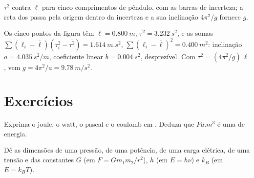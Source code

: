 \begin{omfigure}

{\small $\tau^2$ contra $\ell$ para cinco comprimentos de pêndulo, com as
barras de incerteza; a reta dos  passa pela origem
dentro da incerteza e a sua inclinação $4\pi^2/g$ fornece $g$.}
\end{omfigure}

\begin{example}\label{ex:b1:units-dimensions:slope}
Os cinco pontos da figura têm $\bar\ell = \qty{0.800}{m}$,
$\overline{\tau^2} = \qty{3.232}{s^2}$, e as somas
$\sum (\ell_i - \bar\ell)(\tau_i^2 - \overline{\tau^2}) = \qty{1.614}{m.s^2}$,
$\sum (\ell_i - \bar\ell)^2 = \qty{0.400}{m^2}$: inclinação
$a = \qty{4.035}{s^2/m}$, coeficiente linear $b = \qty{0.004}{s^2}$, desprezível. Com
$\tau^2 = (4\pi^2/g)\,\ell$, vem $g = 4\pi^2/a = \qty{9.78}{m/s^2}$.
\end{example}

\section{Exercícios}

\begin{exercise}[$\star$]\label{exo:b1:units-dimensions:1}
Exprima o joule, o watt, o pascal e o coulomb em .
Deduza que $\unit{Pa.m^3}$ é uma  de energia.
\end{exercise}

\begin{exercise}[$\star$]\label{exo:b1:units-dimensions:2}
Dê as dimensões de uma pressão, de uma potência, de uma carga elétrica, de
uma tensão e das constantes $G$ (em $F = Gm_1m_2/r^2$), $h$ (em
$E = h\nu$) e $k_B$ (em $E = k_B T$).
\end{exercise}

